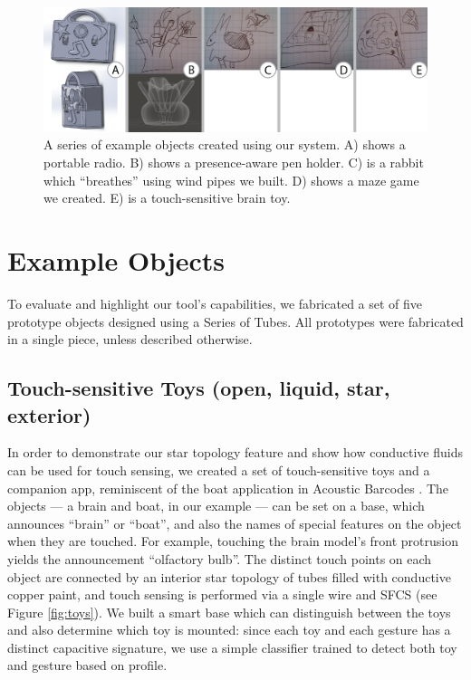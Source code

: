 
\begin{figure}
\centering
    \includegraphics[width=7in]{figures/examples.png}
\caption{A series of example objects created using our system.  A) shows a portable radio.  B) shows a presence-aware pen holder.  C) is a rabbit which ``breathes'' using wind pipes we built.  D) shows a maze game we created.  E) is a touch-sensitive brain toy.  }
\label{fig:examples}
\end{figure}

\section{Example Objects}

To evaluate and highlight our tool's capabilities, we fabricated a set of five prototype objects designed using a Series of Tubes.  All prototypes were fabricated in a single piece, unless described otherwise.

\subsection{Touch-sensitive Toys (open, liquid, star, exterior)}

In order to demonstrate our star topology feature and show how conductive fluids can be used for touch sensing, we created a set of touch-sensitive toys and a companion app, reminiscent of the boat application in Acoustic Barcodes \cite{Harrison-acoustic}. The objects --- a brain and boat, in our example --- can be set on a base, which announces ``brain'' or ``boat'', and also the names of special features on the object when they are touched. For example, touching the brain model's front protrusion yields the announcement ``olfactory bulb''. The distinct touch points on each object are connected by an interior star topology of tubes filled with conductive copper paint, and touch sensing is performed via a single wire and SFCS (see Figure \ref{fig:toys}).  We built a smart base which can distinguish between the toys and also determine which toy is mounted: since each toy and each gesture has a distinct capacitive signature, we use a simple classifier trained to detect both toy and gesture based on profile.

